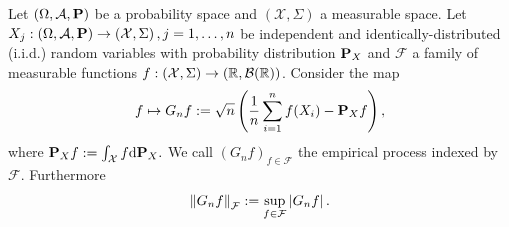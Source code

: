 Let 
$
  \left( 
    \Omega,
    \mathcal{A},
    \P
  \right)
$
be a probability space
and
$
  \left( 
    \mathcal{X},
    \Sigma
  \right)
$
a measurable space.
Let 
$
  X_j
  :
  \left( 
    \Omega,
    \mathcal{A},
    \P
  \right)
  \to
  \left( 
    \mathcal{X},
    \Sigma
  \right)
  ,
  j=1,\ldots, n
$ be independent and identically-distributed (i.i.d.)
random variables
with probability distribution $\P_X$ 
and
$\mathcal{F}$ a family of measurable functions
$
  f:
  \left( 
    \mathcal{X},
    \Sigma
  \right)
    \to
  \left( 
    \R,
    \mathcal{B}(\R)
  \right)
$.
Consider the map
\begin{gather}
  f
  \mapsto
  G_n f
  :=
  \sqrt{n}
  \left( 
    \frac{1}{n}
    \sum_{i = 1}^{n}
      f(X_i)
    -
    \P_X f
  \right),
\end{gather}
where
$
  \P_X f 
  :=
  \int_\mathcal{X} f \text{d}\P_X.
$
We call 
$
  \left( 
    G_n f
  \right)_{f \in \mathcal{F}}
$
the empirical process indexed by $\mathcal{F}$.
Furthermore
\begin{gather}
  \norm{G_n f}_\mathcal{F}
  :=
  \sup_
        { f \in \mathcal{F}}
        \left|
          G_n f
        \right|
        .
\end{gather}


